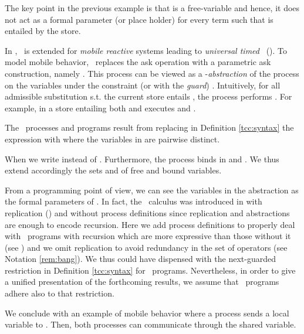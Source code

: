 \documentclass{tlp}
\begin{document}
The key point in the previous example  is that  is a free-variable and
hence,  it  does not act as a formal parameter (or place holder) for every
term   such that  is entailed by the store. 




In  \cite{Olarte:08:SAC}, \tccp\ is extended for \emph{mobile
reactive} systems leading to  \emph{universal timed} \ccp\   (\utcc).
To model mobile behavior,  \utcc\  replaces the  ask operation
 with a   parametric ask construction,
namely .  This process can be viewed as a
-\emph{abstraction} of the process  on the variables
 under the constraint (or with the \emph{guard}) .
Intuitively, for all admissible substitution  s.t. the current store entails , the process   performs . For example,    in a store entailing both  and   executes  and . 
 
\begin{definition}\label{utcc:syntax}
 The \utcc\ processes and programs result from replacing in  
Definition \ref{tcc:syntax} the expression  with 
 where the variables in  are pairwise distinct. 
\end{definition}

  When
 we  write  instead of
.  
Furthermore, the process  binds  in  and . We thus extend accordingly the sets  and  of free and bound variables.  



 From a programming point of view,  we can see the variables
 in the abstraction  as the formal
parameters of    . In fact, 
the \utcc\ calculus was introduced in  \cite{Olarte:08:SAC}  
with replication () and 
without process definitions since replication and abstractions are enough to encode recursion. 
Here we add process definitions to properly deal with  \tccp\ programs with
recursion which are more expressive than those without it (see
\cite{DBLP:conf/ppdp/NielsenPV02}) and we omit replication to avoid
redundancy in the set of operators (see Notation \ref{rem:bang}). 
We thus could have  dispensed with the next-guarded restriction in Definition \ref{tcc:syntax} for  \utcc\ programs. Nevertheless,  in order to give a unified presentation of the forthcoming results, we assume that  \utcc\ programs adhere also to that restriction.



We conclude  with an example of mobile behavior where  a process  sends a local variable to  . Then,  both
processes can communicate through the shared variable. 
\end{document}
